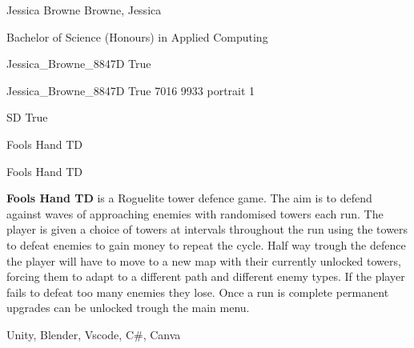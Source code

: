 
\begingroup{}\relax



\def\Key{Jessica_Browne_8847D}

{Jessica Browne}
{Browne, Jessica}

{Bachelor of Science (Honours) in Applied Computing}

{Jessica_Browne_8847D}
{True}

{Jessica_Browne_8847D}
{True}
{7016}
{9933}
{portrait}
{1}

{SD}
{True}

{Fools Hand TD}

{Fools Hand TD}

{{\bfseries Fools Hand TD} is a Roguelite tower defence game. The aim is to defend against waves of approaching enemies with randomised towers each run. The player is given a choice of towers at intervals throughout the run using the towers to defeat enemies to gain money to repeat the cycle.  Half way trough the defence the player will have to move to a new map with their currently unlocked towers, forcing them to adapt to a different path and different enemy types. If the player fails to defeat too many enemies they lose. Once a run is complete permanent upgrades can be unlocked trough the main menu.}

{Unity, Blender, Vscode, C\#, Canva}

